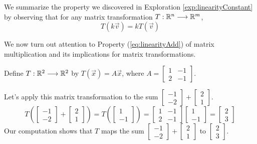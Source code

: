 \documentclass{ximera}
\begin{document}
We summarize the property we discovered in Exploration \ref{exp:linearityConstant} by observing that for any matrix transformation $T:\mathbb{R}^n\longrightarrow \mathbb{R}^m$, 
\begin{equation}\label{eq:linTransProp1}
T(k\vec{v})=kT(\vec{v})
\end{equation}

We now turn out attention to Property (\ref{eq:linearityAdd}) of matrix multiplication and its implications for matrix transformations.
\begin{exploration}\label{exp:linearityDist}
    Define $T:\mathbb{R}^2\longrightarrow\mathbb{R}^2$ by $T(\vec{x})=A\vec{x}$, where $A=\begin{bmatrix}1&-1\\2&-1\end{bmatrix}$.

Let's apply this matrix transformation to the sum $\begin{bmatrix}-1\\-2\end{bmatrix}+\begin{bmatrix}2\\1\end{bmatrix}$.
\begin{equation*}\label{eq:linearitySum1}
T\left(\begin{bmatrix}-1\\-2\end{bmatrix}+\begin{bmatrix}2\\1\end{bmatrix}\right)=T\left(\begin{bmatrix}1\\-1\end{bmatrix}\right)=\begin{bmatrix}1&-1\\2&-1\end{bmatrix}\begin{bmatrix}1\\-1\end{bmatrix}=\begin{bmatrix}2\\3\end{bmatrix}
\end{equation*}
Our computation shows that $T$ maps the sum $\begin{bmatrix}-1\\-2\end{bmatrix}+\begin{bmatrix}2\\1\end{bmatrix}$ to $\begin{bmatrix}2\\3\end{bmatrix}$.


\end{exploration}
\end{document}

